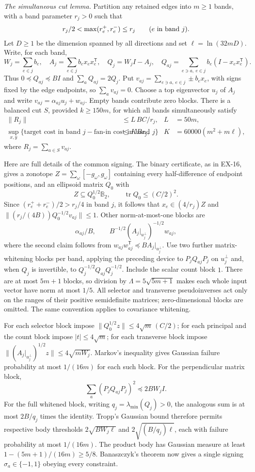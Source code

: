 \emph{The simultaneous cut lemma.}
Partition any retained edges into $m\geq1$ bands, with a band parameter
$r_j>0$ such that
\[
 r_j/2<\max(r_e^+,r_e^-)\leq r_j
 \qquad(e\hbox{ in band }j).
\]
Let $D\geq1$ be the dimension spanned by all directions and set
$\ell=\ln(32mD)$. Write, for each band,
\[
 W_j=\sum_{e\in j}b_e,\quad
 A_j=\sum_{e\in j}b_ex_ex_e^{\mathsf T},\quad Q_j=W_jI-A_j,
 \quad
 Q_{aj}=\sum_{e\ni a,\ e\in j}b_e(I-x_ex_e^{\mathsf T}).
\]
Thus $0\preceq Q_{aj}\preceq BI$ and
$\sum_aQ_{aj}=2Q_j$. Put
$v_{aj}=\sum_{e\ni a,\ e\in j}\pm b_ex_e$, with signs fixed by the
edge endpoints, so $\sum_av_{aj}=0$. Choose a top eigenvector $u_j$ of
$A_j$ and write $v_{aj}=\alpha_{aj}u_j+w_{aj}$. Empty bands contribute
zero blocks. There is a balanced cut $S$, provided $k\geq150m$, for
which all bands simultaneously satisfy
\begin{align}
 \|R_j\|&\leq L\,BC/r_j, & L&=50m,\label{eq:ex-band-resultant}\\
 \sup_{x,y}\{\text{target cost in band }j-
                 \text{fan-in cost in band }j\}
       &\leq KBr_j, & K&=60000(m^2+m\ell),
       \label{eq:ex-band-saving}
\end{align}
where $R_j=\sum_{a\in S}v_{aj}$.

Here are full details of the common signing. The binary certificate,
as in EX-16, gives a zonotope $Z=\sum_\omega[-g_\omega,g_\omega]$
containing every half-difference of endpoint positions, and an
ellipsoid matrix $Q_0$ with
\[
 Z\subseteq Q_0^{1/2}\mathbb B_2,
 \qquad \operatorname{tr}Q_0\leq(C/2)^2.
\]
Since $(r_e^++r_e^-)/2>r_j/4$ in band $j$, it follows that
$x_e\in(4/r_j)Z$ and
$\|(r_j/(4B))Q_0^{-1/2}v_{aj}\|\leq1$.
Other norm-at-most-one blocks are
\[
 \alpha_{aj}/B,\qquad
 B^{-1/2}(A_j|_{u_j^\perp})^{-1/2}w_{aj},
\]
where the second claim follows from
$w_{aj}w_{aj}^{\mathsf T}\preceq B A_j|_{u_j^\perp}$.
Use two further matrix-whitening blocks per band, applying the
preceding device to $P_jQ_{aj}P_j$ on $u_j^\perp$ and, when $Q_j$
is invertible, to $Q_j^{-1/2}Q_{aj}Q_j^{-1/2}$. Include the scalar
count block $1$. There are at most $5m+1$ blocks, so division by
$\Lambda=5\sqrt{5m+1}$ makes each whole input vector have norm at
most $1/5$.
All selector and transverse pseudoinverses act only on the ranges of
their positive semidefinite matrices; zero-dimensional blocks are
omitted. The same convention applies to covariance whitening.

For each selector block impose
$\|Q_0^{1/2}z\|\leq4\sqrt m\,(C/2)$; for each principal and the
count block impose $|t|\leq4\sqrt m$; for each transverse block
impose $\|(A_j|_{u_j^\perp})^{1/2}z\|\leq4\sqrt{mW_j}$.
Markov's inequality gives Gaussian failure probability at most
$1/(16m)$ for each such block. For the perpendicular matrix block,
\[
 \sum_a(P_jQ_{aj}P_j)^2\preceq2BW_j I.
\]
For the full whitened block, writing $q_j=\lambda_{\min}(Q_j)>0$,
the analogous sum is at most $2B/q_j$ times the identity.
Tropp's Gaussian bound therefore permits respective body thresholds
$2\sqrt{BW_j\ell}$ and $2\sqrt{(B/q_j)\ell}$, each with failure
probability at most $1/(16m)$. The product body has Gaussian measure
at least $1-(5m+1)/(16m)\geq5/8$. Banaszczyk's theorem now gives a
single signing $\sigma_a\in\{-1,1\}$ obeying every constraint.

